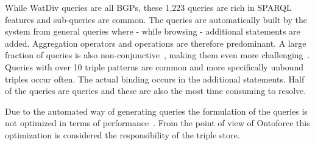 While WatDiv queries are all BGPs, these 1,223 queries are rich in SPARQL features and sub-queries are common.
The queries are automatically built by the system from general queries where - while browsing - additional  statements are added. 
Aggregation operators and  operations are therefore predominant. A large fraction of queries is also non-conjunctive~\cite{conjunctive}, making them even more challenging~\cite{Picalausa2011}.
Queries with over 10 triple patterns are common and more specifically unbound triples occur often. The actual binding occurs in the additional  statements. Half of the queries are  queries and these are also the most time consuming to resolve. 

Due to the automated way of generating queries the formulation of the queries is not optimized in terms of performance~\cite{Groth}. From the point of view of Ontoforce this optimization is considered the responsibility of the triple store.